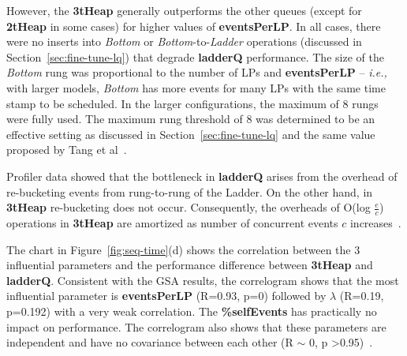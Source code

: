 However, the \textbf{3tHeap} generally outperforms the other queues (except for \textbf{2tHeap} in some cases) for higher values of \textbf{events\-Per\-LP}. In all cases, there were no inserts into \emph{Bottom} or \emph{Bottom}-to-\emph{Ladder} operations (discussed in Section~\ref{sec:fine-tune-lq}) that degrade \textbf{ladderQ} performance. The size of the \emph{Bottom} rung was proportional to the number of LPs and \textbf{eventsPerLP} -- \textit{i.e.,} with larger models, \emph{Bottom} has more events for many LPs with the same time stamp to be scheduled. In the larger configurations, the maximum of 8 rungs were fully used. The maximum rung threshold of 8 was determined to be an effective setting as discussed in Section~\ref{sec:fine-tune-lq} and the same value proposed by Tang et al~\cite{tang-05, higiro2017multi}.

Profiler data showed that the bottleneck in \textbf{ladderQ} arises from the overhead of re-bucketing events from rung-to-rung of the Ladder. On the other hand, in \textbf{3tHeap} re-bucketing does not occur. Consequently, the overheads of O(log $\frac{e}{c}$) operations in \textbf{3tHeap} are amortized as number of concurrent events $c$ increases~\cite{higiro2017multi}.

The chart in Figure~\ref{fig:seq-time}(d) shows the correlation between the 3 influential parameters and the performance difference between \textbf{3tHeap} and \textbf{ladderQ}. Consistent with the GSA results, the correlogram shows that the most influential parameter is \textbf{eventsPerLP} (R=0.93, p=0) followed by $\lambda$ (R=0.19, p=0.192) with a very weak correlation. The \textbf{\%selfEvents} has practically no impact on performance. The correlogram also shows that these parameters are independent and have no covariance between each other
(R $\sim$ 0, p \textgreater 0.95)~\cite{higiro2017multi}.


